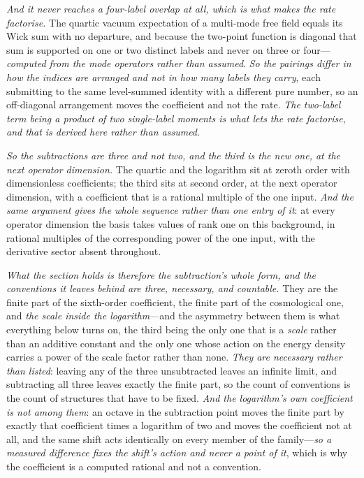 \documentclass[11pt,a4paper]{article}
\theoremstyle{plain}
\theoremstyle{definition}
\theoremstyle{remark}
\begin{document}
\emph{And it never reaches a four-label overlap at all, which is what makes the rate factorise.} The quartic
vacuum expectation of a multi-mode free field equals its Wick sum with no departure, and because the
two-point function is diagonal that sum is supported on one or two distinct labels and never on three or
four---\emph{computed from the mode operators rather than assumed}. \emph{So the pairings differ in how the
indices are arranged and not in how many labels they carry}, each submitting to the same level-summed
identity with a different pure number, so an off-diagonal arrangement moves the coefficient and not the rate.
\emph{The two-label term being a product of two single-label moments is what lets the rate factorise, and
that is derived here rather than assumed}.

\emph{So the subtractions are three and not two, and the third is the new one, at the next operator dimension.} The
quartic and the logarithm sit at zeroth order with dimensionless coefficients; the third sits at second
order, at the next operator dimension, with a coefficient that is a rational multiple of the one input.
\emph{And the same argument gives the whole sequence rather than one entry of it}: at every operator
dimension the basis takes values of rank one on this background, in rational multiples of the corresponding
power of the one input, with the derivative sector absent throughout.

\emph{What the section holds is therefore the subtraction's whole form, and the conventions it leaves behind
are three, necessary, and countable.} They are the finite part of the sixth-order coefficient, the finite part
of the cosmological one, and \emph{the scale inside the logarithm}---and the asymmetry between them is what
everything below turns on, the third being the only one that is a \emph{scale} rather than an additive
constant and the only one whose action on the energy density carries a power of the scale factor rather than
none. \emph{They are necessary rather than listed}: leaving any of the three unsubtracted leaves an infinite
limit, and subtracting all three leaves exactly the finite part, so the count of conventions is the count of
structures that have to be fixed. \emph{And the logarithm's own coefficient is not among them}: an octave in
the subtraction point moves the finite part by exactly that coefficient times a logarithm of two and moves the
coefficient not at all, and the same shift acts identically on every member of the family---\emph{so a measured
difference fixes the shift's action and never a point of it}, which is why the coefficient is a computed
rational and not a convention.
\end{document}
